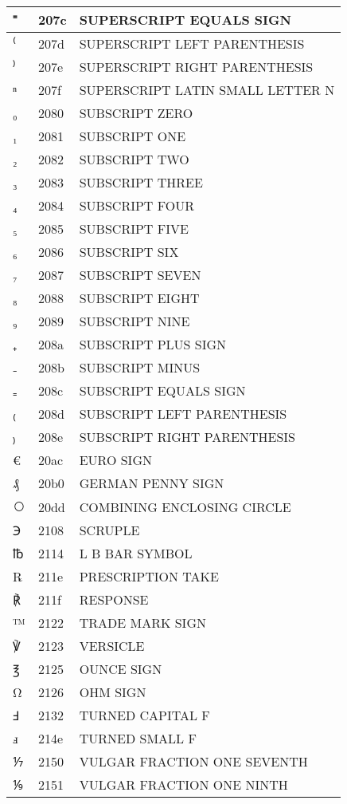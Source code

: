 \documentclass[12pt,letterpaper,openany]{book}
\begin{document}
\begin{center}
\begin{supertabular}{|m{0.25in}|m{0.5in}|m{4in}|}
⁼ & 207c & SUPERSCRIPT EQUALS SIGN\\\hline
⁽ & 207d & SUPERSCRIPT LEFT PARENTHESIS\\\hline
⁾ & 207e & SUPERSCRIPT RIGHT PARENTHESIS\\\hline
ⁿ & 207f & SUPERSCRIPT LATIN SMALL LETTER N\\\hline
₀ & 2080 & SUBSCRIPT ZERO\\\hline
₁ & 2081 & SUBSCRIPT ONE\\\hline
₂ & 2082 & SUBSCRIPT TWO\\\hline
₃ & 2083 & SUBSCRIPT THREE\\\hline
₄ & 2084 & SUBSCRIPT FOUR\\\hline
₅ & 2085 & SUBSCRIPT FIVE\\\hline
₆ & 2086 & SUBSCRIPT SIX\\\hline
₇ & 2087 & SUBSCRIPT SEVEN\\\hline
₈ & 2088 & SUBSCRIPT EIGHT\\\hline
₉ & 2089 & SUBSCRIPT NINE\\\hline
₊ & 208a & SUBSCRIPT PLUS SIGN\\\hline
₋ & 208b & SUBSCRIPT MINUS\\\hline
₌ & 208c & SUBSCRIPT EQUALS SIGN\\\hline
₍ & 208d & SUBSCRIPT LEFT PARENTHESIS\\\hline
₎ & 208e & SUBSCRIPT RIGHT PARENTHESIS\\\hline
€ & 20ac & EURO SIGN\\\hline
₰ & 20b0 & GERMAN PENNY SIGN\\\hline
⃝ & 20dd & COMBINING ENCLOSING CIRCLE\\\hline
℈ & 2108 & SCRUPLE\\\hline
℔ & 2114 & L B BAR SYMBOL\\\hline
℞ & 211e & PRESCRIPTION TAKE\\\hline
℟ & 211f & RESPONSE\\\hline
™ & 2122 & TRADE MARK SIGN\\\hline
℣ & 2123 & VERSICLE\\\hline
℥ & 2125 & OUNCE SIGN\\\hline
Ω & 2126 & OHM SIGN\\\hline
Ⅎ & 2132 & TURNED CAPITAL F\\\hline
ⅎ & 214e & TURNED SMALL F\\\hline
⅐ & 2150 & VULGAR FRACTION ONE SEVENTH\\\hline
⅑ & 2151 & VULGAR FRACTION ONE NINTH\\\hline

\end{supertabular}
\end{center}
\end{document}
